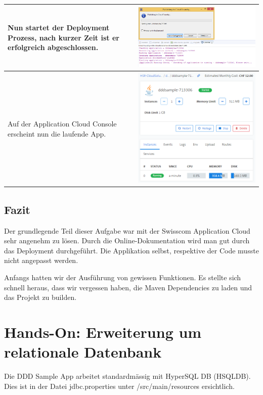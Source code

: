 \begin{longtable}{| p{5cm} | p{11cm} |}
 \\ \hline
Nun startet der Deployment Prozess, nach kurzer Zeit ist er erfolgreich abgeschlossen.
&\includegraphics[width=0.65\columnwidth, valign=T]{images/ddd_cloud_deployment/7.png}
 \\ \hline
Auf der Application Cloud Console erscheint nun die laufende App.
&\includegraphics[width=0.65\columnwidth, valign=T]{images/ddd_cloud_deployment/8.png}
 \\ \hline
\end{longtable}
\section{Fazit}
Der grundlegende Teil dieser Aufgabe war mit der Swisscom Application Cloud sehr angenehm zu lösen. Durch die Online-Dokumentation wird man gut durch das Deployment durchgeführt. Die Applikation selbst, respektive der Code musste nicht angepasst werden. 

Anfangs hatten wir der Ausführung von gewissen Funktionen. Es stellte sich schnell heraus, dass wir vergessen haben, die Maven Dependencies zu laden und das Projekt zu builden.
\chapter{Hands-On: Erweiterung um relationale Datenbank}
Die DDD Sample App arbeitet standardmässig mit HyperSQL DB (HSQLDB). Dies ist in der Datei jdbc.properties unter /src/main/resources ersichtlich. 

